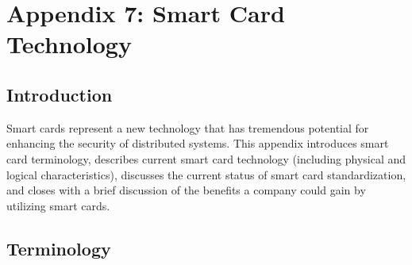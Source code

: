 \chapter{Appendix 7: Smart Card Technology}

\section{Introduction}

Smart cards represent a new technology that has tremendous potential
for enhancing the security of distributed systems. This appendix
introduces smart card terminology, describes current smart card
technology (including physical and logical characteristics), discusses
the current status of smart card standardization, and closes with a
brief discussion of the benefits a company could gain by utilizing
smart cards.


\section{Terminology}

